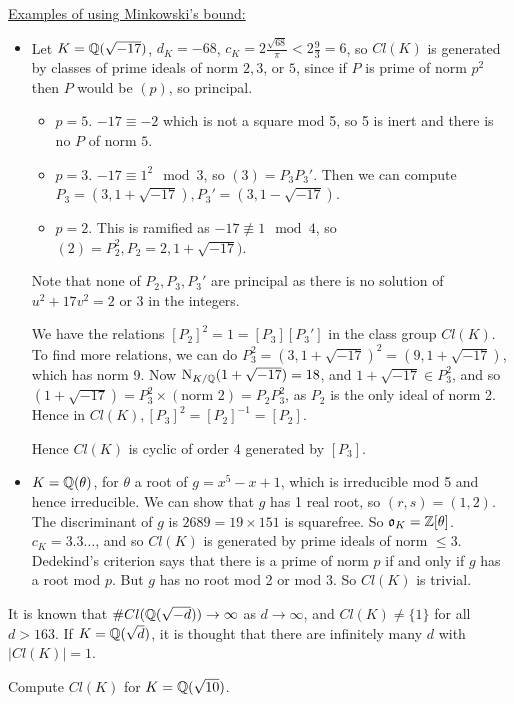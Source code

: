 \documentclass[10pt,a4paper]{article}
\begin{document}
\underline{Examples of using Minkowski's bound:}
\begin{itemize}
\item Let $K = \mathbb{Q}(\sqrt{-17})$, $d_K = -68$, $c_K = 2\frac{\sqrt{68}}{\pi}<2\frac{9}{3} = 6$, so $Cl(K)$ is generated by classes of prime ideals of norm $2,3$, or $5$, since if $P$ is prime of norm $p^2$ then $P$ would be $(p)$, so principal.

\begin{itemize}
\item $p=5$. $-17 \equiv -2$ which is not a square mod 5, so 5 is inert and there is no $P$ of norm $5$.
\item $p=3$. $-17 \equiv 1^2 \mod 3$, so $(3) = P_3P_3'$. Then we can compute $P_3 = (3, 1+\sqrt{-17}), P_3' = (3, 1-\sqrt{-17})$.
\item $p=2$. This is ramified as $-17 \nequiv 1 \mod 4$, so $(2) = P_2^2, P_2 = 2, 1+\sqrt{-17})$.
\end{itemize}
Note that none of $P_2, P_3, P_3'$ are principal as there is no solution of $u^2 + 17v^2 = 2$ or $3$ in the integers.

We have the relations $[P_2]^2 = 1 = [P_3][P_3']$ in the class group $Cl(K)$. To find more relations, we can do $P_3^2 = (3,1+\sqrt{-17})^2 = (9, 1+\sqrt{-17})$, which has norm 9. Now $\operatorname{N}_{K/\mathbb{Q}}(1+\sqrt{-17}) = 18$, and $1+\sqrt{-17} \in P_3^2$, and so $(1+\sqrt{-17}) = P_3^2 \times (\text{norm 2}) = P_2P_3^2$, as $P_2$ is the only ideal of norm 2. Hence in $Cl(K), [P_3]^2 = [P_2]^{-1} = [P_2]$. 

Hence $Cl(K)$ is cyclic of order 4 generated by $[P_3]$.

\item $K = \mathbb{Q}(\theta)$, for $\theta$ a root of $g = x^5 - x+1$, which is irreducible mod 5 and hence irreducible. We can show that $g$ has 1 real root, so $(r,s) = (1,2)$. The discriminant of $g$ is $2689 = 19\times 151$ is squarefree. So $\mathfrak{o}_K = \mathbb{Z}[\theta]$. $c_K = 3.3\ldots$, and so $Cl(K)$ is generated by prime ideals of norm $\leq 3$. Dedekind's criterion says that there is a prime of norm $p$ if and only if $g$ has a root mod $p$. But $g$ has no root mod 2 or mod 3. So $Cl(K)$ is trivial.
\end{itemize}
It is known that $\#Cl(\mathbb{Q}(\sqrt{-d})) \to \infty$ as $d \to \infty$, and $Cl(K) \neq \{1\}$ for all $d > 163$. If $K = \mathbb{Q}(\sqrt{d})$, it is thought that there are infinitely many $d$ with $|Cl(K)| = 1$.

\example Compute $Cl(K)$ for $K = \mathbb{Q}(\sqrt{10})$.
\end{document}

